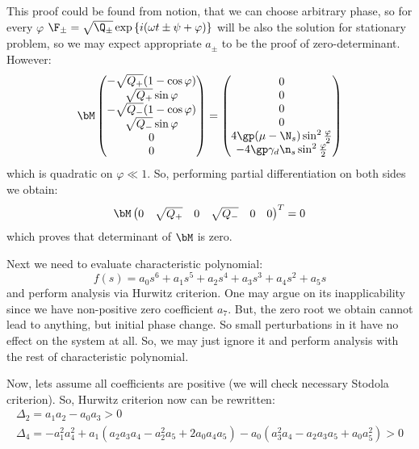 \documentclass[12pt, notitlepage]{report}
\begin{document}
This proof could be found from notion, that we can choose arbitrary phase, so for every $\varphi$ $\F_\pm = \sqrt{\Q_\pm}\exp\left\{ i(\omega t \pm \psi + \varphi) \right\}$ will be also the solution for stationary problem, so we may expect appropriate $a_\pm$ to be the proof of zero-determinant. However:
\begin{equation}
	\bM \begin{pmatrix}
		-\sqrt{Q_+}(1-\cos\varphi) \\
		\sqrt{Q_+}\sin\varphi \\
		-\sqrt{Q_-}(1-\cos\varphi) \\
		\sqrt{Q_-}\sin\varphi \\
		0 \\
		0
	\end{pmatrix} = \begin{pmatrix}
	0 \\
	0 \\
	0 \\
	0 \\
	4\gp (\mu - \N_s)\sin^2\frac{\varphi}{2} \\
	-4\gp \gamma_d\n_s\sin^2\frac{\varphi}{2}
\end{pmatrix}
\end{equation}
which is quadratic on $\varphi \ll 1$. So, performing partial differentiation on both sides we obtain:
\begin{equation}
	\bM \begin{pmatrix}
		0 & \sqrt{Q_+} &  0 & \sqrt{Q_-} & 0 & 0
	\end{pmatrix}^T = 0
\end{equation}
which proves that determinant of $\bM$ is zero.

Next we need to evaluate characteristic polynomial:
\begin{equation}
	f(s) = a_0 s^6 + a_1 s^5 + a_2 s^4 + a_3 s^3 + a_4 s ^2 + a_5 s
\end{equation}
and perform analysis via Hurwitz criterion. One may argue on its inapplicability since we have non-positive zero coefficient $a_7$. But, the zero root we obtain cannot lead to anything, but initial phase change. So small perturbations in it have no effect on the system at all. So, we may just ignore it and perform analysis with the rest of characteristic polynomial.

Now, lets assume all coefficients are positive (we will check necessary Stodola criterion). So, Hurwitz criterion now can be rewritten:
\begin{gather}
	\Delta_2 = a_1 a_2 - a_0 a_3 > 0 \\
	\Delta_4 = -a_1^2 a_4^2 + a_1 (a_2 a_3 a_4 - a_2^2 a_5 + 2 a_0 a_4 a_5) - 
	a_0 (a_3^2 a_4 - a_2 a_3 a_5 + a_0 a_5^2) > 0
\end{gather}
\end{document}
